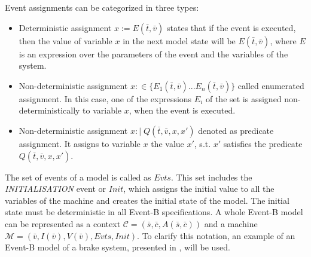 Event assignments can be categorized in three types:
\begin{itemize}
    \item Deterministic assignment $x := E(\bar{t},\bar{v})$ states that if the event is executed, then the value of variable $x$ in the next model state will be $E(\bar{t},\bar{v})$, where $E$ is an expression over the parameters of the event and the variables of the system.
    \item Non-deterministic assignment $x :\in  \{ E_1(\bar{t},\bar{v})... E_n(\bar{t},\bar{v}) \}$ called enumerated assignment. In this case, one of the expressions $E_i$ of the set is assigned non-deterministically to variable $x$, when the event is executed.
    \item Non-deterministic assignment $x :\! | \; Q(\bar{t}, \bar{v}, x, x')$ denoted as predicate assignment. It assigns to variable $x$ the value $x'$, s.t. $x'$ satisfies the predicate $Q(\bar{t}, \bar{v}, x, x')$.
\end{itemize}
The set of events of a model is called as $Evts$. This set includes the \textit{INITIALISATION} event or $Init$, which assigns the initial value to all the variables of the machine and creates the initial state of the model. The initial state must be deterministic in all Event-B specifications. A whole Event-B model can be represented as a context $\mathscr{C} = (\bar{s},\bar{c}, A(\bar{s},\bar{c}))$ and a machine $\mathscr{M} =(\bar{v}, I(\bar{v}), V(\bar{v}), Evts, Init)$.
To clarify this notation, an example of an Event-B model of a brake system, presented in \cite{Aouadhi2017}, will be used. 

